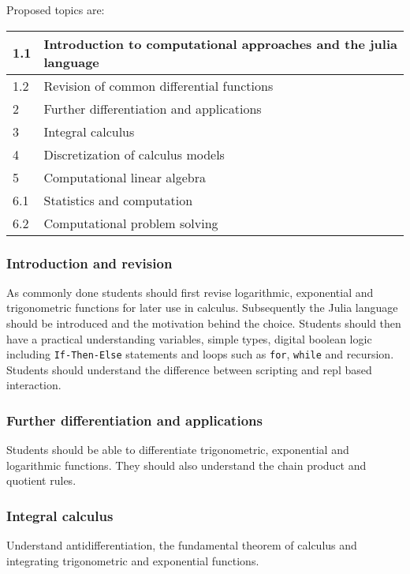 \documentclass[12pt]{report}
\begin{document}
    Proposed topics are:
    \begin{table}[H]
        \centering
        \begin{tabular}{|l|l|}
        \hline
            1.1 & Introduction to computational approaches and the julia language\\ \hline
            1.2 & Revision of common differential functions\\ \hline
            2 & Further differentiation and applications \\ \hline
            3 & Integral calculus \\ \hline
            4 & Discretization of calculus models\\ \hline
            5 & Computational linear algebra \\ \hline
            6.1 & Statistics and computation \\ \hline
            6.2 & Computational problem solving \\ \hline
        \end{tabular}
    \end{table}

    \subsubsection{Introduction and revision} As commonly done students should first revise logarithmic, exponential and trigonometric functions for later use in calculus. Subsequently the Julia language should be introduced and the motivation behind the choice. Students should then have a practical understanding variables, simple types, digital boolean logic including \verb|If-Then-Else| statements and loops such as \verb|for|, \verb|while| and recursion. Students should understand the difference between scripting and repl based interaction.
    
    \subsubsection{Further differentiation and applications} Students should be able to differentiate trigonometric, exponential and logarithmic functions. They should also understand the chain product and quotient rules.

    \subsubsection{Integral calculus} Understand antidifferentiation, the fundamental theorem of calculus and integrating trigonometric and exponential functions.
\end{document}
